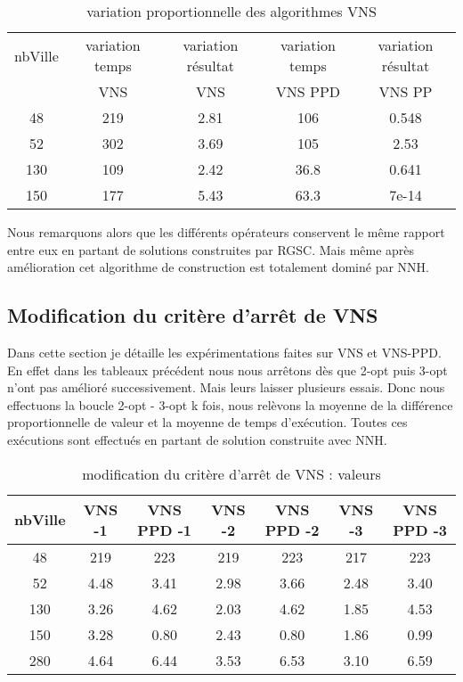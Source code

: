 \documentclass[12pt,a4paper]{article}
\begin{document}
\begin{table}[!h]
\centering
\begin{tabular}{|*{5}{c|}}
  \hline
  nbVille & variation temps & variation résultat & variation temps & variation résultat \\
  ~ & VNS & VNS & VNS PPD & VNS PP \\
  \hline
  48 & 219 & 2.81 & 106 & 0.548 \\ 
  52 & 302 & 3.69 & 105 & 2.53 \\
  130 & 109 & 2.42 & 36.8 & 0.641 \\
  150 & 177 & 5.43 & 63.3 & 7e-14 \\
  \hline
\end{tabular}
\caption{variation proportionnelle des algorithmes VNS}
\label{variationVNSRGSC}
\end{table}

Nous remarquons alors que les différents opérateurs conservent le même rapport entre eux en partant de solutions construites par RGSC. Mais même après amélioration cet algorithme de construction est totalement dominé par NNH.\\

\subsection{Modification du critère d’arrêt de VNS}

Dans cette section je détaille les expérimentations faites sur VNS et VNS-PPD. En effet dans les tableaux précédent nous nous arrêtons dès que 2-opt puis 3-opt n'ont pas amélioré successivement. Mais leurs laisser plusieurs essais. Donc nous effectuons la boucle 2-opt - 3-opt k fois, nous relèvons la moyenne de la différence proportionnelle de valeur et la moyenne de temps d’exécution. Toutes ces exécutions sont effectués en partant de solution construite avec NNH.

\begin{table}[!h]
\centering
\begin{tabular}{|*{7}{c|}}
  \hline
  nbVille & VNS -1 & VNS PPD -1 & VNS -2 & VNS PPD -2 & VNS -3 & VNS PPD -3 \\
  \hline
  48 & 219 & 223 & 219 & 223 & 217 & 223 \\ 
  52 & 4.48 & 3.41 & 2.98 & 3.66 & 2.48 & 3.40 \\
  130 & 3.26 & 4.62 & 2.03 & 4.62 & 1.85 & 4.53 \\
  150 & 3.28 & 0.80 & 2.43 & 0.80 & 1.86 & 0.99 \\ 
  280 & 4.64 & 6.44 & 3.53 & 6.53 & 3.10 & 6.59 \\
  \hline
\end{tabular}
\caption{modification du critère d’arrêt de VNS : valeurs}
\label{stopingRuleVNSval}
\end{table}
\end{document}
